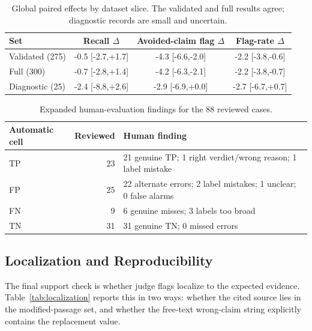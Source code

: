 \begin{table}[H]
\centering
\scriptsize
\begin{tabular*}{\linewidth}{@{\extracolsep{\fill}}lccc@{}}
\toprule
Set & Recall $\Delta$ & \makecell{Avoided-claim\\flag $\Delta$} & Flag-rate $\Delta$ \\
\midrule
Validated (275) & -0.5 [-2.7,+1.7] & -4.3 [-6.6,-2.0] & -2.2 [-3.8,-0.6] \\
Full (300) & -0.7 [-2.8,+1.4] & -4.2 [-6.3,-2.1] & -2.2 [-3.8,-0.7] \\
Diagnostic (25) & -2.4 [-8.8,+2.6] & -2.9 [-6.9,+0.0] & -2.7 [-6.7,+0.7] \\
\bottomrule
\end{tabular*}
\caption{Global paired effects by dataset slice. The validated and full results agree; diagnostic records are small and uncertain.}
\label{tab:sensitivity}
\end{table}



\begin{table}[H]
\centering
\scriptsize
\begin{tabularx}{\linewidth}{@{}L{1.25cm}rY@{}}
\toprule
Automatic cell & Reviewed & Human finding \\
\midrule
TP & 23 & 21 genuine TP; 1 right verdict/wrong reason; 1 label mistake \\
FP & 25 & 22 alternate errors; 2 label mistakes; 1 unclear; 0 false alarms \\
FN & 9 & 6 genuine misses; 3 labels too broad \\
TN & 31 & 31 genuine TN; 0 missed errors \\
\bottomrule
\end{tabularx}
\caption{Expanded human-evaluation findings for the 88 reviewed cases.}
\label{tab:human-eval-findings}
\end{table}

\FloatBarrier

\subsection{Localization and Reproducibility}
\label{app:localization-table}

The final support check is whether judge flags localize to the expected evidence. Table~\ref{tab:localization} reports this in two ways: whether the cited source lies in the modified-passage set, and whether the free-text wrong-claim string explicitly contains the replacement value.

